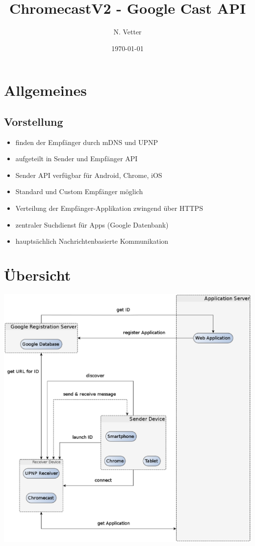 \documentclass{beamer}
\title{ChromecastV2 - Google Cast API}
\author{N. Vetter}
\date{\today}
\institute[Universität Potsdam]{
	Institut für Informatik
}
\begin{document}
\begin{frame}

\titlepage

\end{frame}

\section{Allgemeines}
\subsection{Vorstellung}
\begin{frame}

\begin{itemize}
\item finden der Empfänger durch mDNS und UPNP
\item aufgeteilt in Sender und Empfänger API
\item Sender API verfügbar für Android, Chrome, iOS
\item Standard und Custom Empfänger möglich
\item Verteilung der Empfänger-Applikation zwingend über HTTPS 
\item zentraler Suchdienst für Apps (Google Datenbank)
\item hauptsächlich Nachrichtenbasierte Kommunikation
\end{itemize}
\end{frame}

\section{Übersicht}
\begin{frame}
\includegraphics[scale=0.28]{neu0.eps}
\end{frame}
\end{document}
